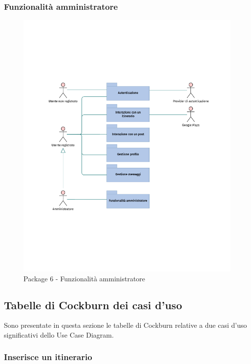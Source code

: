 \documentclass{natourDoc}
\begin{document}
\subsubsection{Funzionalità amministratore}
\begin{figure}[!htbp]
	\centering
	\includegraphics[width=\textwidth, page=7]{./diagrams/useCase.pdf}
	\caption{Package 6 - Funzionalità amministratore}
\end{figure}
\FloatBarrier

\newpage
\subsection{Tabelle di Cockburn dei casi d'uso}
Sono presentate in questa sezione le tabelle di Cockburn relative a due casi d'uso significativi dello Use Case Diagram.

\subsubsection{Inserisce un itinerario}
\end{document}
